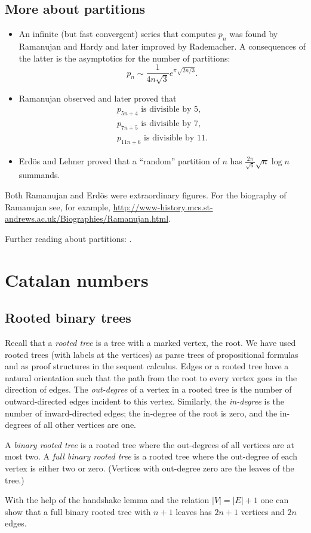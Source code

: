 \subsection{More about partitions}
\begin{itemize}
\item 
An infinite (but fast convergent) series that computes $p_n$ was found by Ramanujan and Hardy and later improved by Rademacher.
A consequences of the latter is the asymptotics for the number of partitions:
\[
p_n \sim \frac{1}{4n\sqrt{3}} e^{\pi\sqrt{2n/3}}.
\]
\item
Ramanujan observed and later proved that
\begin{gather*}
p_{5n+4} \text{ is divisible by } 5,\\
p_{7n+5} \text{ is divisible by } 7,\\
p_{11n+6} \text{ is divisible by } 11.
\end{gather*}
\item
Erd\"os and Lehner proved that a ``random'' partition of $n$ has $\frac{2\pi}{\sqrt{6}} \sqrt{n} \log n$ summands.
\end{itemize}

Both Ramanujan and Erd\"os were extraordinary figures.
For the biography of Ramanujan see, for example,
\url{http://www-history.mcs.st-andrews.ac.uk/Biographies/Ramanujan.html}.

Further reading about partitions: \cite{AE04}.


\newpage

\section{Catalan numbers}
\subsection{Rooted binary trees}
Recall that a \emph{rooted tree} is a tree with a marked vertex, the root.
We have used rooted trees (with labels at the vertices) as parse trees of propositional formulas
and as proof structures in the sequent calculus.
Edges or a rooted tree have a natural orientation such that the path from the root to every vertex goes in the direction of edges.
The \emph{out-degree} of a vertex in a rooted tree is the number of outward-directed edges incident to this vertex.
Similarly, the \emph{in-degree} is the number of inward-directed edges; the in-degree of the root is zero, and the in-degrees of all other vertices are one.

A \emph{binary rooted tree} is a rooted tree where the out-degrees of all vertices are at most two.
A \emph{full binary rooted tree} is a rooted tree where the out-degree of each vertex is either two or zero.
(Vertices with out-degree zero are the leaves of the tree.)

With the help of the handshake lemma and the relation $|V| = |E| + 1$ one can show that
a full binary rooted tree with $n+1$ leaves has $2n+1$ vertices and $2n$ edges.
